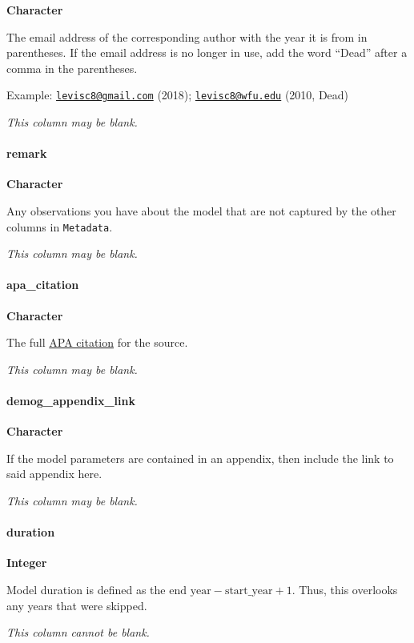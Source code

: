 \documentclass[]{article}
\let\oldparagraph\paragraph
\renewcommand{\paragraph}[1]{\oldparagraph{#1}\mbox{}}
\begin{document}
\textbf{Character}

The email address of the corresponding author with the year it is from
in parentheses. If the email address is no longer in use, add the word
``Dead'' after a comma in the parentheses.

Example: \href{mailto:levisc8@gmail.com}{\nolinkurl{levisc8@gmail.com}}
(2018); \href{mailto:levisc8@wfu.edu}{\nolinkurl{levisc8@wfu.edu}}
(2010, Dead)

\emph{This column may be blank.}

\paragraph{remark}\label{remark}

\textbf{Character}

Any observations you have about the model that are not captured by the
other columns in \texttt{Metadata}.

\emph{This column may be blank.}

\paragraph{apa\_citation}\label{apa_citation}

\textbf{Character}

The full \href{http://www.bibme.org/apa}{APA citation} for the source.

\emph{This column may be blank.}

\paragraph{demog\_appendix\_link}\label{demog_appendix_link}

\textbf{Character}

If the model parameters are contained in an appendix, then include the
link to said appendix here.

\emph{This column may be blank.}

\paragraph{duration}\label{duration}

\textbf{Integer}

Model duration is defined as the
\(\text{end year} - \text{start_year} + 1\). Thus, this overlooks any
years that were skipped.

\emph{This column cannot be blank.}
\end{document}
